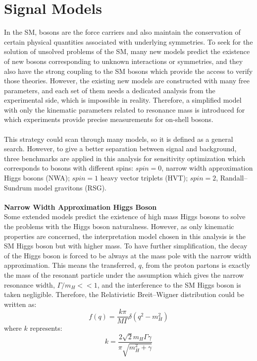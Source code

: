 \section{Signal Models}
\label{sec:signal_intro}
In the SM, bosons are the force carriers and also maintain the conservation of certain physical quantities associated with underlying symmetries. To seek for the solution of unsolved problems of the SM, many new models predict the existence of new bosons corresponding to unknown interactions or symmetries, and they also have the strong coupling to the SM bosons which provide the access to verify those theories. However, the existing new models are constructed with many free parameters, and each set of them needs a dedicated analysis from the experimental side, which is impossible in reality. Therefore, a simplified model with only the kinematic parameters related to resonance mass is introduced for which experiments provide precise measurements for on-shell bosons.  
\\
\\This strategy could scan through many models, so it is defined as a general search. However, to give a better separation between signal and background, three benchmarks are applied in this analysis for sensitivity optimization which corresponds to bosons with different spins: $spin=0$, narrow width approximation Higgs bosons (NWA); $spin=1$ heavy vector triplets (HVT); $spin=2$, Randall–Sundrum model gravitons (RSG).
\\
\\{\bf Narrow Width Approximation Higgs Boson}
\\
Some extended models predict the existence of high mass Higgs bosons to solve the problems with the Higgs boson naturalness. However, as only kinematic properties are concerned, the interpretation model chosen in this analysis is the SM Higgs boson but with higher mass. To have further simplification, the decay of the Higgs boson is forced to be always at the mass pole with the narrow width approximation. This means the transferred, $q$, from the proton partons is exactly the mass of the resonant particle under the assumption which gives the narrow resonance width, $\Gamma/m_{H}<<1$, and the interference to the SM Higgs boson is taken negligible. Therefore, the Relativistic Breit–Wigner distribution could be written as:
\begin{equation}
f(q) = \frac{k\pi}{M\Gamma}\delta(q^2-m_{H}^2)
\end{equation}
where $k$ represents:
\begin{equation}
k=\frac{2\sqrt{2}m_{H}\Gamma\gamma}{\pi\sqrt{m_{H}^2+\gamma}}
\end{equation}
